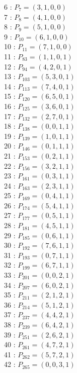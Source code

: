 \documentclass{article}
\begin{document}
{\begin{multicols}{3}
6 : $P_{7}=( 3, 1, 0, 0 )$\\
7 : $P_{8}=( 4, 1, 0, 0 )$\\
8 : $P_{9}=( 5, 1, 0, 0 )$\\
9 : $P_{10}=( 6, 1, 0, 0 )$\\
10 : $P_{11}=( 7, 1, 0, 0 )$\\
11 : $P_{83}=( 1, 1, 0, 1 )$\\
12 : $P_{94}=( 4, 2, 0, 1 )$\\
13 : $P_{103}=( 5, 3, 0, 1 )$\\
14 : $P_{113}=( 7, 4, 0, 1 )$\\
15 : $P_{120}=( 6, 5, 0, 1 )$\\
16 : $P_{125}=( 3, 6, 0, 1 )$\\
17 : $P_{132}=( 2, 7, 0, 1 )$\\
18 : $P_{138}=( 0, 0, 1, 1 )$\\
19 : $P_{139}=( 1, 0, 1, 1 )$\\
20 : $P_{146}=( 0, 1, 1, 1 )$\\
21 : $P_{153}=( 0, 2, 1, 1 )$\\
22 : $P_{156}=( 3, 2, 1, 1 )$\\
23 : $P_{161}=( 0, 3, 1, 1 )$\\
24 : $P_{163}=( 2, 3, 1, 1 )$\\
25 : $P_{169}=( 0, 4, 1, 1 )$\\
26 : $P_{174}=( 5, 4, 1, 1 )$\\
27 : $P_{177}=( 0, 5, 1, 1 )$\\
28 : $P_{181}=( 4, 5, 1, 1 )$\\
29 : $P_{185}=( 0, 6, 1, 1 )$\\
30 : $P_{192}=( 7, 6, 1, 1 )$\\
31 : $P_{193}=( 0, 7, 1, 1 )$\\
32 : $P_{199}=( 6, 7, 1, 1 )$\\
33 : $P_{201}=( 0, 0, 2, 1 )$\\
34 : $P_{207}=( 6, 0, 2, 1 )$\\
35 : $P_{211}=( 2, 1, 2, 1 )$\\
36 : $P_{214}=( 5, 1, 2, 1 )$\\
37 : $P_{237}=( 4, 4, 2, 1 )$\\
38 : $P_{239}=( 6, 4, 2, 1 )$\\
39 : $P_{251}=( 2, 6, 2, 1 )$\\
40 : $P_{261}=( 4, 7, 2, 1 )$\\
41 : $P_{262}=( 5, 7, 2, 1 )$\\
42 : $P_{265}=( 0, 0, 3, 1 )$\\

\end{multicols}}
\end{document}
